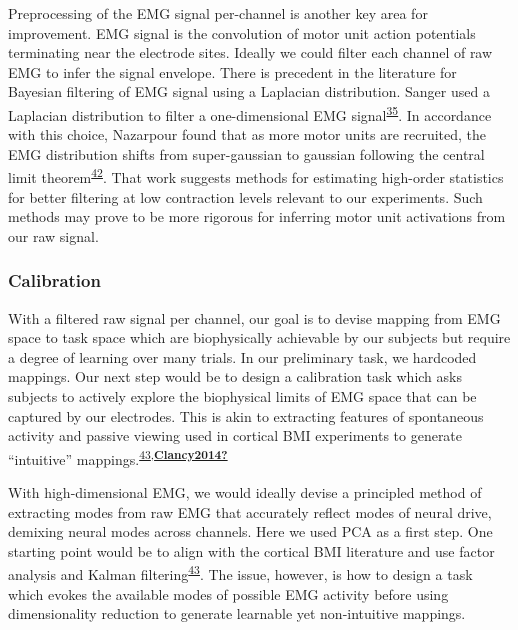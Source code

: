 \documentclass[
  a4paper,
]{article}
\begin{document}
Preprocessing of the EMG signal per-channel is another key area for
improvement. EMG signal is the convolution of motor unit action
potentials terminating near the electrode sites. Ideally we could filter
each channel of raw EMG to infer the signal envelope. There is precedent
in the literature for Bayesian filtering of EMG signal using a Laplacian
distribution. Sanger used a Laplacian distribution to filter a
one-dimensional EMG
signal\textsuperscript{\protect\hyperlink{ref-sangerBayesianFilteringMyoelectric2007}{35}}.
In accordance with this choice, Nazarpour found that as more motor units
are recruited, the EMG distribution shifts from super-gaussian to
gaussian following the central limit
theorem\textsuperscript{\protect\hyperlink{ref-nazarpourNoteProbabilityDistribution2013}{42}}.
That work suggests methods for estimating high-order statistics for
better filtering at low contraction levels relevant to our experiments.
Such methods may prove to be more rigorous for inferring motor unit
activations from our raw signal.

\hypertarget{calibration}{%
\subsubsection{Calibration}\label{calibration}}

With a filtered raw signal per channel, our goal is to devise mapping
from EMG space to task space which are biophysically achievable by our
subjects but require a degree of learning over many trials. In our
preliminary task, we hardcoded mappings. Our next step would be to
design a calibration task which asks subjects to actively explore the
biophysical limits of EMG space that can be captured by our electrodes.
This is akin to extracting features of spontaneous activity and passive
viewing used in cortical BMI experiments to generate ``intuitive''
mappings.\textsuperscript{\protect\hyperlink{ref-sadtlerNeuralConstraintsLearning2014}{43},\protect\hyperlink{ref-Clancy2014}{\textbf{Clancy2014?}}}

With high-dimensional EMG, we would ideally devise a principled method
of extracting modes from raw EMG that accurately reflect modes of neural
drive, demixing neural modes across channels. Here we used PCA as a
first step. One starting point would be to align with the cortical BMI
literature and use factor analysis and Kalman
filtering\textsuperscript{\protect\hyperlink{ref-sadtlerNeuralConstraintsLearning2014}{43}}.
The issue, however, is how to design a task which evokes the available
modes of possible EMG activity before using dimensionality reduction to
generate learnable yet non-intuitive mappings.
\end{document}
